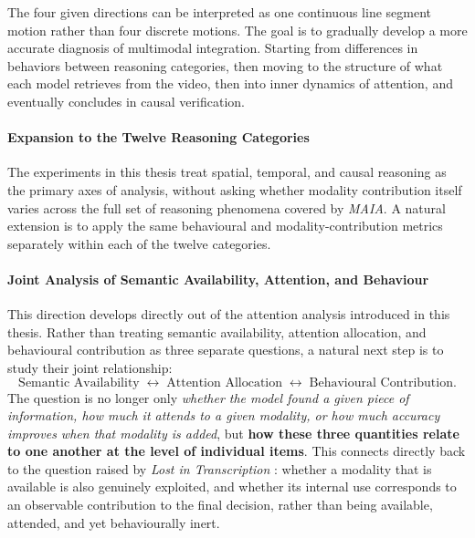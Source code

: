 The four given directions can be interpreted as one continuous line segment motion rather than four discrete motions. The goal is to gradually develop a more accurate diagnosis of multimodal integration. Starting from differences in behaviors between reasoning categories, then moving to the structure of what each model retrieves from the video, then into inner dynamics of attention, and eventually concludes in causal verification. 
\paragraph{Expansion to the Twelve Reasoning Categories}
The experiments in this thesis treat spatial, temporal, and causal reasoning as the primary axes of analysis, without asking whether modality contribution itself varies across the full set of reasoning phenomena covered by \textit{MAIA}. A natural extension is to apply the same behavioural and modality-contribution metrics separately within each of the twelve categories.
\paragraph{Joint Analysis of Semantic Availability, Attention, and Behaviour}
This direction develops directly out of the attention analysis introduced in this thesis. Rather than treating semantic availability, attention allocation, and behavioural contribution as three separate questions, a natural next step is to study their joint relationship:
\begin{equation}
\text{Semantic Availability}
\;\longleftrightarrow\;
\text{Attention Allocation}
\;\longleftrightarrow\;
\text{Behavioural Contribution}.
\end{equation}
The question is no longer only \textit {whether the model found a given piece of information, how much it attends to a given modality, or how much accuracy improves when that modality is added}, but \textbf{ how these three quantities relate to one another at the level of individual items}. This connects directly back to the question raised by \textit{Lost in Transcription} \cite{deodati2026lost}: whether a modality that is available is also genuinely exploited, and whether its internal use corresponds to an observable contribution to the final decision, rather than being available, attended, and yet behaviourally inert.
